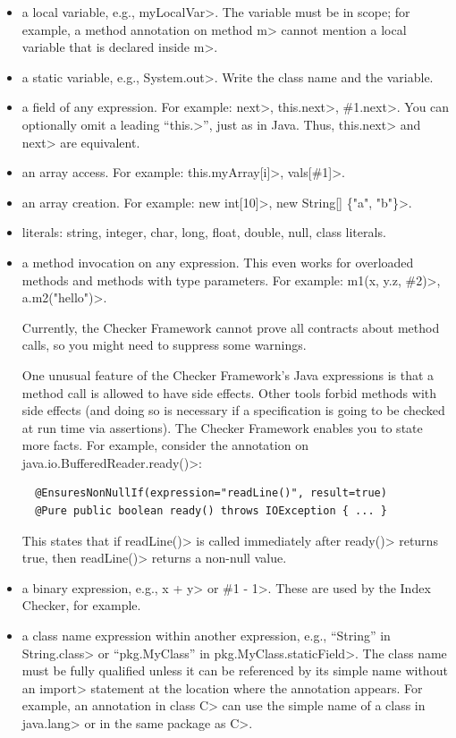 \begin{itemize}
\item
  a local variable, e.g., \<myLocalVar>.
  The variable must be in scope; for example, a method annotation on method
  \<m> cannot mention a local variable that is declared inside \<m>.

\item
  a static variable, e.g., \<System.out>.
  Write the class name and the variable.

\item
  a field of any expression.  For example:  \<next>,
  \<this.next>, \<\#1.next>. %
  You can optionally omit a leading ``\<this.>'', just as in Java.  Thus,
  \<this.next> and \<next> are equivalent.

\item
  an array access.  For example:  \<this.myArray[i]>, \<vals[\#1]>.

\item
  an array creation. For example: \<new int[10]>, \<new String[] \{"a", "b"\}>.

\item literals: string, integer, char, long, float, double, null, class literals.

\item a method invocation on any expression.
  This even works for overloaded methods and methods with type parameters.
  For example:
  \<m1(x, y.z, \#2)>, \<a.m2("hello")>.

  Currently, the Checker Framework cannot prove all contracts about method
  calls, so you might need to suppress some warnings.

  One unusual feature of the Checker Framework's Java expressions is that a
  method call is allowed to have side effects.  Other tools forbid methods
  with side effects (and doing so is necessary if a specification is going
  to be checked at run time via assertions).  The Checker Framework enables
  you to state more facts.  For example, consider the annotation on
  \<java.io.BufferedReader.ready()>:

\begin{Verbatim}
  @EnsuresNonNullIf(expression="readLine()", result=true)
  @Pure public boolean ready() throws IOException { ... }
\end{Verbatim}

  This states that if \<readLine()> is called immediately after \<ready()>
  returns true, then \<readLine()> returns a non-null value.

\item a binary expression, e.g., \<x + y> or \<\#1 - 1>.  These are used by
  the Index Checker, for example.

\item a class name expression within another expression, e.g., ``String''
  in \<String.class> or ``pkg.MyClass'' in \<pkg.MyClass.staticField>.  The
  class name must be fully qualified unless it can be referenced by its
  simple name without an \<import> statement at the location where the
  annotation appears.  For example, an annotation in class \<C> can use the
  simple name of a class in \<java.lang> or in the same package as \<C>.

\end{itemize}

